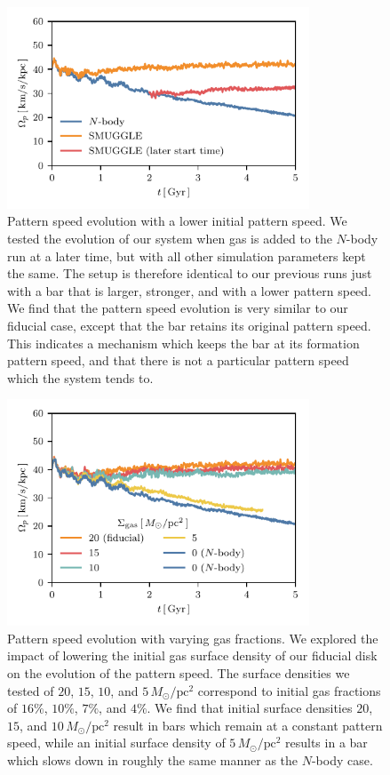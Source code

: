 \documentclass[twocolumn,linenumbers,trackchanges]{aastex631}
\newcommand{\Nbody}{$N$-body}
\newcommand{\Msun}{\ensuremath{M_{\odot}}}
\begin{document}
\begin{figure}
    \centering
    \includegraphics[width=9cm]{fig/ps_late_start.pdf}
    \caption{Pattern speed evolution with a lower initial pattern speed. We
    tested the evolution of our system when gas is added to the \Nbody{} run at
    a later time, but with all other simulation parameters kept the same. The
    setup is therefore identical to our previous runs just with a bar that is
    larger, stronger, and with a lower pattern speed. We find that the pattern
    speed evolution is very similar to our fiducial case, except that the bar
    retains its original pattern speed. This indicates a mechanism which keeps
    the bar at its formation pattern speed, and that there is not a particular
    pattern speed which the system tends to.}
    \label{fig:snap700}
\end{figure}

\begin{figure}
    \centering
    \includegraphics[width=9cm]{fig/ps_fgas.pdf}
    \caption{Pattern speed evolution with varying gas fractions. We explored the
    impact of lowering the initial gas surface density of our fiducial disk on
    the evolution of the pattern speed. The surface densities we tested of $20$,
    $15$, $10$, and $5\,\Msun/\textrm{pc}^2$ correspond to initial gas
    fractions of $16\%$, $10\%$, $7\%$, and $4\%$. We find that initial surface
    densities $20$, $15$, and $10\,\Msun/\textrm{pc}^2$ result in bars which
    remain at a constant pattern speed, while an initial surface density of
    $5\,\Msun/\textrm{pc}^2$ results in a bar which slows down in roughly the
    same manner as the \Nbody{} case.}
    \label{fig:fgas}
\end{figure}
\end{document}
